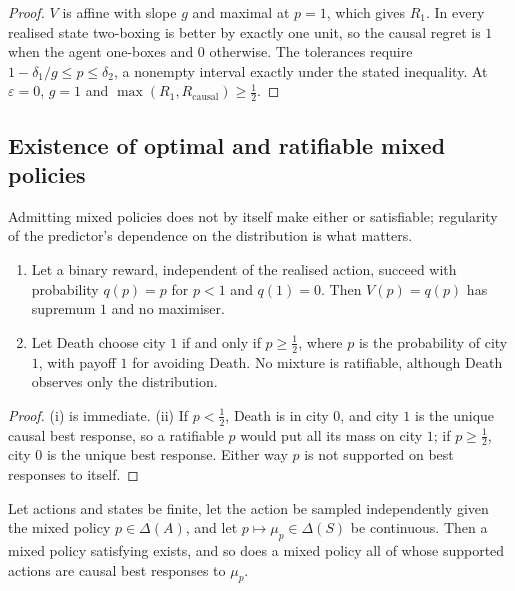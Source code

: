 \begin{proof}
$V$ is affine with slope $g$ and maximal at $p=1$, which gives $R_1$. In every realised state
two-boxing is better by exactly one unit, so the causal regret is $1$ when the agent one-boxes and
$0$ otherwise. The tolerances require $1-\delta_1/g\le p\le\delta_2$, a nonempty interval exactly
under the stated inequality. At $\varepsilon=0$, $g=1$ and $\max(R_1,R_{\mathrm{causal}})\ge\tfrac12$.
\end{proof}

\subsection{Existence of optimal and ratifiable mixed policies}\label{sec:mixedexist}

Admitting mixed policies does not by itself make either  or  satisfiable; regularity
of the predictor's dependence on the distribution is what matters.

\begin{proposition}\label{prop:mixedfail}
\begin{enumerate}[label=(\roman*)]
  \item Let a binary reward, independent of the realised action, succeed with probability $q(p)=p$ for
        $p<1$ and $q(1)=0$. Then $V(p)=q(p)$ has supremum $1$ and no maximiser.
  \item Let Death choose city $1$ if and only if $p\ge\tfrac12$, where $p$ is the probability of city $1$,
        with payoff $1$ for avoiding Death. No mixture is ratifiable, although Death observes only the
        distribution.
\end{enumerate}
\end{proposition}

\begin{proof}
(i) is immediate. (ii) If $p<\tfrac12$, Death is in city $0$, and city $1$ is the unique causal best
response, so a ratifiable $p$ would put all its mass on city $1$; if $p\ge\tfrac12$, city $0$ is the
unique best response. Either way $p$ is not supported on best responses to itself.
\end{proof}

\begin{theorem}\label{thm:mixedexist}
Let actions and states be finite, let the action be sampled independently given the mixed policy
$p\in\Delta(A)$, and let $p\mapsto\mu_p\in\Delta(S)$ be continuous. Then a mixed policy satisfying
 exists, and so does a mixed policy all of whose supported actions are causal best responses
to $\mu_p$.
\end{theorem}

